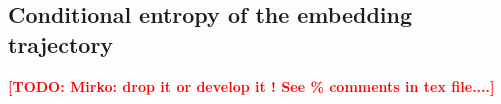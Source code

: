 \documentclass[preprint]{elsarticle}
\newcommand{\et}{\mathbf{e}_t}
\newcommand{\TODO}[1]{\textcolor{red}{\textbf{[TODO: #1]}}}
\begin{document}
%
%
%
%
%
%
\subsection{Conditional entropy of the embedding trajectory}
\label{sec:cond_entropy}
\TODO{Mirko: drop it or develop it !  See \% comments in tex file....}
\end{document}
